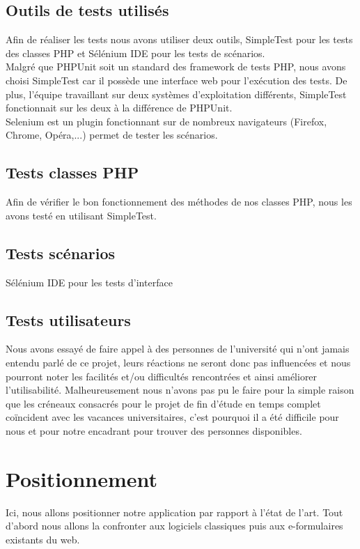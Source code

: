 \documentclass{sigplanconf}
\begin{document}
\subsection{Outils de tests utilisés}
Afin de réaliser les tests nous avons utiliser deux outils, SimpleTest pour les tests des classes PHP et Sélénium IDE pour les tests de scénarios.\\
Malgré que PHPUnit soit un standard des framework de tests PHP, nous avons choisi SimpleTest car il possède une interface web pour l’exécution des tests. De plus, l’équipe travaillant sur deux systèmes d’exploitation différents, SimpleTest fonctionnait sur les deux à la différence de PHPUnit.\\
Selenium est un plugin fonctionnant sur de nombreux navigateurs (Firefox, Chrome, Opéra,...) permet de tester les scénarios.

\subsection{Tests classes PHP} %
Afin de vérifier le bon fonctionnement des méthodes de nos classes PHP, nous les avons testé en utilisant SimpleTest.

\subsection{Tests scénarios} %
Sélénium IDE pour les tests d’interface

\subsection{Tests utilisateurs}
Nous avons essayé de faire appel à des personnes de l’université qui n’ont jamais entendu parlé de ce projet, leurs réactions ne seront donc pas influencées et nous pourront noter les facilités et/ou difficultés rencontrées et ainsi améliorer l’utilisabilité. Malheureusement nous n’avons pas pu le faire pour la simple raison que les créneaux consacrés pour le projet de fin d'étude en temps complet coïncident avec les vacances universitaires, c’est pourquoi il a été difficile pour nous et pour notre encadrant pour trouver des personnes disponibles.

\section{Positionnement}
Ici, nous allons positionner notre application par rapport à l’état de l’art. Tout d’abord nous allons la confronter aux logiciels classiques puis aux e-formulaires existants du web.
\end{document}
